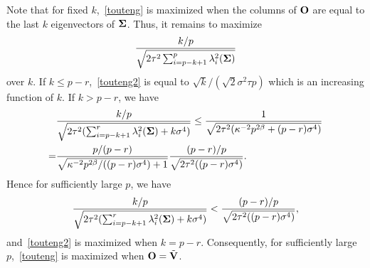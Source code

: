 \documentclass[review]{elsarticle}
\theoremstyle{plain}
\theoremstyle{definition}
\theoremstyle{remark}
\begin{document}
Note that for fixed $k$,~\eqref{touteng} is maximized when the columns of $\mathbf{O}$ are equal to the last $k$ eigenvectors of $\boldsymbol{\Sigma}$.
Thus, it remains to maximize
\begin{equation}\label{touteng2}
\frac{k/p}{\sqrt{2\tau^2\sum_{i=p-k+1}^p \lambda_i^2 (\boldsymbol{\Sigma})}}
\end{equation}
over $k$.
If $k\leq p-r$,~\eqref{touteng2} is equal to $\sqrt{k}/(\sqrt{2} \sigma^2 \tau p)$ which is an increasing function of $k$.
If $k> p-r$, we have
\begin{equation*}
    \begin{aligned}
        &\frac{k/p}{\sqrt{2\tau^2(\sum_{i=p-k+1}^r \lambda_i^2(\boldsymbol{\Sigma})+k\sigma^4)}}
        \leq
        \frac{1}{\sqrt{2\tau^2(\kappa^{-2}p^{2\beta}+(p-r)\sigma^4)}}\\
        =&
        \frac{p/(p-r)}{\sqrt{\kappa^{-2}p^{2\beta}/((p-r)\sigma^4)+1}}
\frac{(p-r)/p}{\sqrt{2\tau^2((p-r)\sigma^4)}}.
    \end{aligned}
\end{equation*}
Hence for sufficiently large $p$, we have
\begin{equation*}
    \begin{aligned}
        \frac{k/p}{\sqrt{2\tau^2(\sum_{i=p-k+1}^r \lambda_i^2(\boldsymbol{\Sigma})+k\sigma^4)}}
        <
\frac{(p-r)/p}{\sqrt{2\tau^2((p-r)\sigma^4)}},
    \end{aligned}
\end{equation*}
and~\eqref{touteng2} is maximized when $k=p-r$.
Consequently, for sufficiently large $p$,~\eqref{touteng} is maximized when $\mathbf{O}=\tilde{\mathbf{V}}$.
\end{document}
